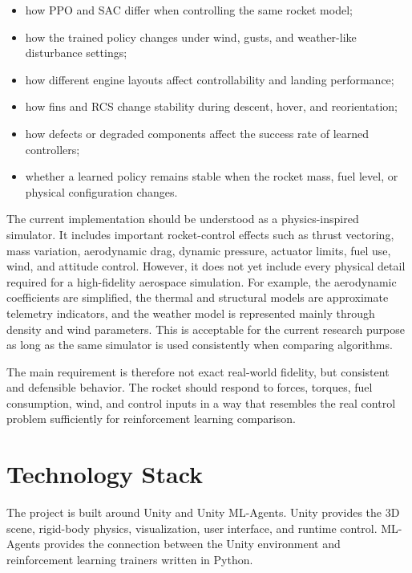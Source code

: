 \documentclass[12pt,a4paper]{article}
\begin{document}
\begin{itemize}
    \item how PPO and SAC differ when controlling the same rocket model;
    \item how the trained policy changes under wind, gusts, and weather-like disturbance settings;
    \item how different engine layouts affect controllability and landing performance;
    \item how fins and RCS change stability during descent, hover, and reorientation;
    \item how defects or degraded components affect the success rate of learned controllers;
    \item whether a learned policy remains stable when the rocket mass, fuel level, or physical configuration changes.
\end{itemize}

The current implementation should be understood as a physics-inspired simulator. It includes important rocket-control effects such as thrust vectoring, mass variation, aerodynamic drag, dynamic pressure, actuator limits, fuel use, wind, and attitude control. However, it does not yet include every physical detail required for a high-fidelity aerospace simulation. For example, the aerodynamic coefficients are simplified, the thermal and structural models are approximate telemetry indicators, and the weather model is represented mainly through density and wind parameters. This is acceptable for the current research purpose as long as the same simulator is used consistently when comparing algorithms.

The main requirement is therefore not exact real-world fidelity, but consistent and defensible behavior. The rocket should respond to forces, torques, fuel consumption, wind, and control inputs in a way that resembles the real control problem sufficiently for reinforcement learning comparison.

\section{Technology Stack}

The project is built around Unity and Unity ML-Agents. Unity provides the 3D scene, rigid-body physics, visualization, user interface, and runtime control. ML-Agents provides the connection between the Unity environment and reinforcement learning trainers written in Python.
\end{document}
